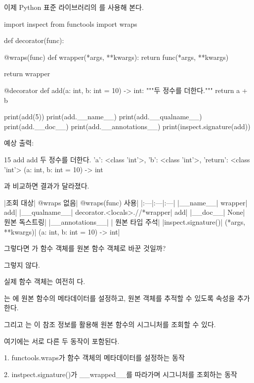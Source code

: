 이제 Python 표준 라이브러리의 를 사용해 본다.

\begin{dhkcode}
import inspect
from functools import wraps

def decorator(func):

    @wraps(func)
    def wrapper(*args, **kwargs):
        return func(*args, **kwargs)

    return wrapper


@decorator
def add(a: int, b: int = 10) -> int:
    """두 정수를 더한다."""
    return a + b


print(add(5))
print(add.__name__)
print(add.__qualname__)
print(add.__doc__)
print(add.__annotations__)
print(inspect.signature(add))
\end{dhkcode}

예상 출력:

\begin{dhkzsh}
15
add
add
두 정수를 더한다.
{'a': <class 'int'>, 'b': <class 'int'>, 'return': <class 'int'>}
(a: int, b: int = 10) -> int
\end{dhkzsh}

과 비교하면 결과가 달라졌다.

\begin{dhktable}
|조회 대상|	@wraps 없음|	@wraps(func) 사용|
|:---|:---|:---|
|__name__|	wrapper|	add|
|__qualname__|	decorator.<locals>.//*wrapper|	add|
|__doc__|	None|	원본 독스트링|
|__annotations__|	{}|	원본 타입 주석|
|inspect.signature()|	(*args, **kwargs)|	(a: int, b: int = 10) -> int|
\end{dhktable}

그렇다면 가  함수 객체를 원본  함수 객체로 바꾼 것일까?

그렇지 않다.

실제 함수 객체는 여전히 다.

는 에 원본 함수의 메타데이터를 설정하고, 원본 객체를 추적할 수 있도록  속성을 추가한다.

그리고 는 이 참조 정보를 활용해 원본 함수의 시그니처를 조회할 수 있다.

여기에는 서로 다른 두 동작이 포함된다.

\begin{dhksmry}
1. functools.wraps가 함수 객체의 메타데이터를 설정하는 동작

2. instpect.signature()가 __wrapped__를 따라가며 시그니처를
   조회하는 동작
\end{dhksmry}

